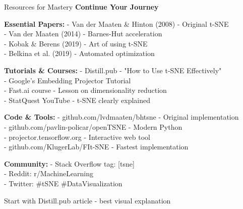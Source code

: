 \documentclass[10pt]{beamer}
\newcommand{\emphtext}[1]{\textcolor{upcblue}{\textbf{#1}}}
\newcommand{\conceptbox}[1]{\colorbox{upcblue!10}{\begin{minipage}{0.85\textwidth}\centering #1\end{minipage}}}
\begin{document}
\begin{frame}{Resources for Mastery}
\emphtext{Continue Your Journey}

\vspace{0.3cm}
\textbf{Essential Papers:}
\footnotesize
- Van der Maaten \& Hinton (2008) - Original t-SNE\\
- Van der Maaten (2014) - Barnes-Hut acceleration\\
- Kobak \& Berens (2019) - Art of using t-SNE\\
- Belkina et al. (2019) - Automated optimization

\vspace{0.2cm}
\textbf{Tutorials \& Courses:}
\footnotesize
- Distill.pub - "How to Use t-SNE Effectively"\\
- Google's Embedding Projector Tutorial\\
- Fast.ai course - Lesson on dimensionality reduction\\
- StatQuest YouTube - t-SNE clearly explained

\vspace{0.2cm}
\textbf{Code \& Tools:}
\footnotesize
- github.com/lvdmaaten/bhtsne - Original implementation\\
- github.com/pavlin-policar/openTSNE - Modern Python\\
- projector.tensorflow.org - Interactive web tool\\
- github.com/KlugerLab/FIt-SNE - Fastest implementation

\vspace{0.2cm}
\textbf{Community:}
\footnotesize
- Stack Overflow tag: [tsne]\\
- Reddit: r/MachineLearning\\
- Twitter: \#tSNE \#DataVisualization

\begin{center}
\conceptbox{\footnotesize Start with Distill.pub article - best visual explanation}
\end{center}
\end{frame}
\end{document}
